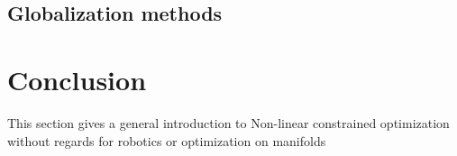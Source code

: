 \subsection{Globalization methods}
\label{sub:globalization_methods}




\section{Conclusion}
This section gives a general introduction to Non-linear constrained optimization without regards for robotics or optimization on manifolds

